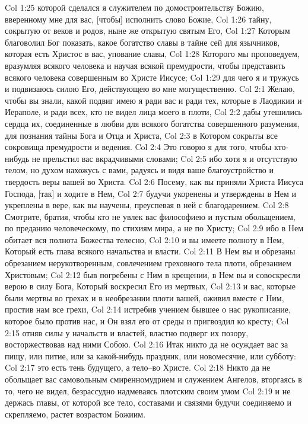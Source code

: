 Col 1:25  которой сделался я служителем по домостроительству Божию, вверенному мне для вас, [чтобы] исполнить слово Божие,
Col 1:26  тайну, сокрытую от веков и родов, ныне же открытую святым Его,
Col 1:27  Которым благоволил Бог показать, какое богатство славы в тайне сей для язычников, которая есть Христос в вас, упование славы,
Col 1:28  Которого мы проповедуем, вразумляя всякого человека и научая всякой премудрости, чтобы представить всякого человека совершенным во Христе Иисусе;
Col 1:29  для чего я и тружусь и подвизаюсь силою Его, действующею во мне могущественно.
Col 2:1  Желаю, чтобы вы знали, какой подвиг имею я ради вас и ради тех, которые в Лаодикии и Иераполе, и ради всех, кто не видел лица моего в плоти,
Col 2:2  дабы утешились сердца их, соединенные в любви для всякого богатства совершенного разумения, для познания тайны Бога и Отца и Христа,
Col 2:3  в Котором сокрыты все сокровища премудрости и ведения.
Col 2:4  Это говорю я для того, чтобы кто-нибудь не прельстил вас вкрадчивыми словами;
Col 2:5  ибо хотя я и отсутствую телом, но духом нахожусь с вами, радуясь и видя ваше благоустройство и твердость веры вашей во Христа.
Col 2:6  Посему, как вы приняли Христа Иисуса Господа, [так] и ходите в Нем,
Col 2:7  будучи укоренены и утверждены в Нем и укреплены в вере, как вы научены, преуспевая в ней с благодарением.
Col 2:8  Смотрите, братия, чтобы кто не увлек вас философиею и пустым обольщением, по преданию человеческому, по стихиям мира, а не по Христу;
Col 2:9  ибо в Нем обитает вся полнота Божества телесно,
Col 2:10  и вы имеете полноту в Нем, Который есть глава всякого начальства и власти.
Col 2:11  В Нем вы и обрезаны обрезанием нерукотворенным, совлечением греховного тела плоти, обрезанием Христовым;
Col 2:12  быв погребены с Ним в крещении, в Нем вы и совоскресли верою в силу Бога, Который воскресил Его из мертвых,
Col 2:13  и вас, которые были мертвы во грехах и в необрезании плоти вашей, оживил вместе с Ним, простив нам все грехи,
Col 2:14  истребив учением бывшее о нас рукописание, которое было против нас, и Он взял его от среды и пригвоздил ко кресту;
Col 2:15  отняв силы у начальств и властей, властно подверг их позору, восторжествовав над ними Собою.
Col 2:16  Итак никто да не осуждает вас за пищу, или питие, или за какой-нибудь праздник, или новомесячие, или субботу:
Col 2:17  это есть тень будущего, а тело--во Христе.
Col 2:18  Никто да не обольщает вас самовольным смиренномудрием и служением Ангелов, вторгаясь в то, чего не видел, безрассудно надмеваясь плотским своим умом
Col 2:19  и не держась главы, от которой все тело, составами и связями будучи соединяемо и скрепляемо, растет возрастом Божиим.
